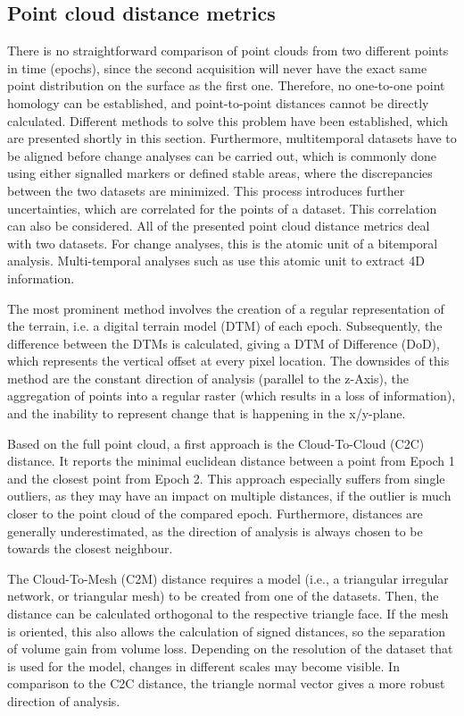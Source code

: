\documentclass[preprint,12pt,3p]{elsarticle}
\begin{document}
\subsection{Point cloud distance metrics}

There is no straightforward comparison of point clouds from two different points in time (epochs), since the second acquisition will never have the exact same point distribution on the surface as the first one. Therefore, no one-to-one point homology can be established, and point-to-point distances cannot be directly calculated. Different methods to solve this problem have been established, which are presented shortly in this section. Furthermore, multitemporal datasets have to be aligned before change analyses can be carried out, which is commonly done using either signalled markers or defined stable areas, where the discrepancies between the two datasets are minimized. This process introduces further uncertainties, which are correlated for the points of a dataset. This correlation can also be considered. All of the presented point cloud distance metrics deal with two datasets. For change analyses, this is the atomic unit of a bitemporal analysis. Multi-temporal analyses such as \citet{anders20204d} use this atomic unit to extract 4D information.

The most prominent method involves the creation of a regular representation of the terrain, i.e. a digital terrain model (DTM) of each epoch. Subsequently, the difference between the DTMs is calculated, giving a DTM of Difference (DoD), which represents the vertical offset at every pixel location. The downsides of this method are the constant direction of analysis (parallel to the z-Axis), the aggregation of points into a regular raster (which results in a loss of information), and the inability to represent change that is happening in the x/y-plane.

Based on the full point cloud, a first approach is the Cloud-To-Cloud (C2C) distance. It reports the minimal euclidean distance between a point from Epoch 1 and the closest point from Epoch 2. This approach especially suffers from single outliers, as they may have an impact on multiple distances, if the outlier is much closer to the point cloud of the compared epoch. Furthermore, distances are generally underestimated, as the direction of analysis is always chosen to be towards the closest neighbour.

The Cloud-To-Mesh (C2M) distance requires a model (i.e., a triangular irregular network, or triangular mesh) to be created from one of the datasets. Then, the distance can be calculated orthogonal to the respective triangle face. If the mesh is oriented, this also allows the calculation of signed distances, so the separation of volume gain from volume loss. Depending on the resolution of the dataset that is used for the model, changes in different scales may become visible. In comparison to the C2C distance, the triangle normal vector gives a more robust direction of analysis.
\end{document}
